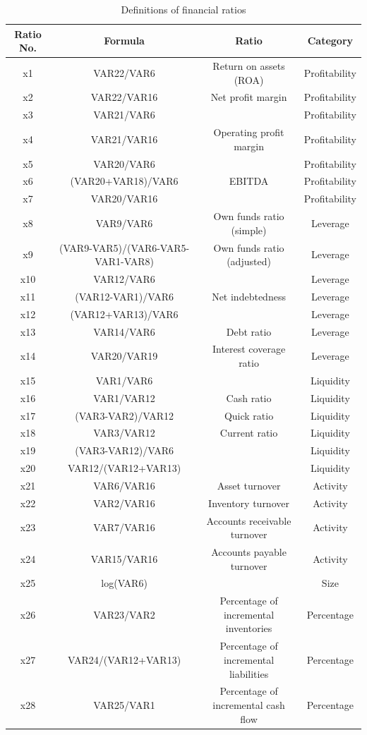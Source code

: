 \documentclass{article}
\begin{document}
\begin{table}[t]
\begin{center}
\caption{Definitions of financial ratios}
\scriptsize
\begin{tabular}{cccc} 
\hline\hline
Ratio No. & Formula & Ratio & Category\\ 
\hline
x1 & VAR22/VAR6 & Return on assets (ROA) & Profitability\\
x2 & VAR22/VAR16 & Net profit margin & Profitability\\
x3 & VAR21/VAR6 & & Profitability\\
x4 & VAR21/VAR16 & Operating profit margin & Profitability\\
x5 & VAR20/VAR6 & & Profitability\\
x6 & (VAR20+VAR18)/VAR6 & EBITDA & Profitability\\ 
x7 & VAR20/VAR16 & & Profitability\\
x8 & VAR9/VAR6 & Own funds ratio (simple) & Leverage\\
x9 & (VAR9-VAR5)/(VAR6-VAR5-VAR1-VAR8) & Own funds ratio (adjusted) & Leverage\\
x10 & VAR12/VAR6 & & Leverage\\
x11 & (VAR12-VAR1)/VAR6 & Net indebtedness & Leverage\\
x12 & (VAR12+VAR13)/VAR6 & & Leverage\\
x13 & VAR14/VAR6 & Debt ratio & Leverage\\
x14 & VAR20/VAR19 & Interest coverage ratio & Leverage\\  
x15 & VAR1/VAR6 & & Liquidity\\
x16 & VAR1/VAR12 & Cash ratio & Liquidity\\
x17 & (VAR3-VAR2)/VAR12 & Quick ratio & Liquidity\\
x18 & VAR3/VAR12 & Current ratio & Liquidity\\ 
x19 & (VAR3-VAR12)/VAR6 & & Liquidity\\
x20 & VAR12/(VAR12+VAR13) & & Liquidity\\
x21 & VAR6/VAR16 & Asset turnover & Activity\\
x22 & VAR2/VAR16 & Inventory turnover & Activity\\
x23 & VAR7/VAR16 & Accounts receivable turnover & Activity\\
x24 & VAR15/VAR16 & Accounts payable turnover & Activity\\
x25 & log(VAR6) & & Size\\
x26 & VAR23/VAR2 & Percentage of incremental inventories & Percentage\\
x27 & VAR24/(VAR12+VAR13) & Percentage of incremental liabilities & Percentage\\
x28 & VAR25/VAR1 & Percentage of incremental cash flow & Percentage\\ 
\hline\hline
\end{tabular}
\end{center}
\end{table}
\end{document}
